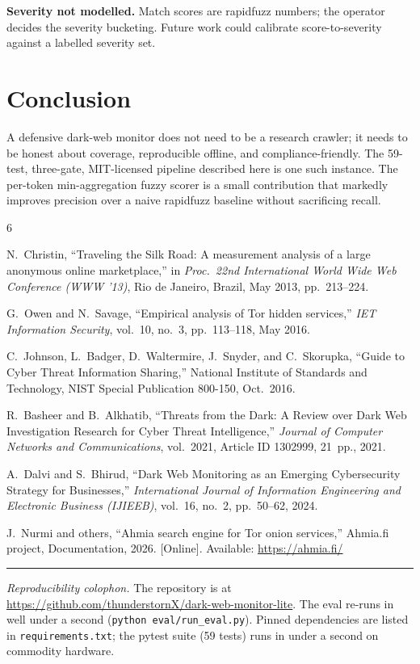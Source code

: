 \documentclass[conference]{IEEEtran}
\begin{document}
\textbf{Severity not modelled.} Match scores are rapidfuzz numbers;
the operator decides the severity bucketing. Future work could
calibrate score-to-severity against a labelled severity set.

\section{Conclusion}
A defensive dark-web monitor does not need to be a research
crawler; it needs to be honest about coverage, reproducible
offline, and compliance-friendly. The 59-test, three-gate,
MIT-licensed pipeline described here is one such instance. The
per-token min-aggregation fuzzy scorer is a small contribution
that markedly improves precision over a naive rapidfuzz baseline
without sacrificing recall.


\begin{thebibliography}{6}

N.~Christin, ``Traveling the Silk Road: A measurement analysis of
a large anonymous online marketplace,'' in
\emph{Proc.\ 22nd International World Wide Web Conference
(WWW '13)}, Rio de Janeiro, Brazil, May 2013, pp.\ 213--224.

G.~Owen and N.~Savage, ``Empirical analysis of Tor hidden
services,'' \emph{IET Information Security}, vol.~10, no.~3,
pp.~113--118, May 2016.

C.~Johnson, L.~Badger, D.~Waltermire, J.~Snyder, and C.~Skorupka,
``Guide to Cyber Threat Information Sharing,'' National Institute
of Standards and Technology, NIST Special Publication 800-150,
Oct.\ 2016.

R.~Basheer and B.~Alkhatib, ``Threats from the Dark: A Review over
Dark Web Investigation Research for Cyber Threat Intelligence,''
\emph{Journal of Computer Networks and Communications}, vol.~2021,
Article ID 1302999, 21~pp., 2021.

A.~Dalvi and S.~Bhirud, ``Dark Web Monitoring as an Emerging
Cybersecurity Strategy for Businesses,'' \emph{International
Journal of Information Engineering and Electronic Business
(IJIEEB)}, vol.~16, no.~2, pp.~50--62, 2024.

J.~Nurmi and others, ``Ahmia search engine for Tor onion
services,'' Ahmia.fi project, Documentation, 2026. [Online].
Available: \url{https://ahmia.fi/}

\end{thebibliography}

\vspace{2mm}
\noindent\rule{\linewidth}{0.4pt}

\noindent\textit{Reproducibility colophon.} The repository is at
\url{https://github.com/thunderstornX/dark-web-monitor-lite}. The
eval re-runs in well under a second
(\texttt{python eval/run\_eval.py}). Pinned dependencies are listed
in \texttt{requirements.txt}; the pytest suite (59 tests) runs in
under a second on commodity hardware.
\end{document}
